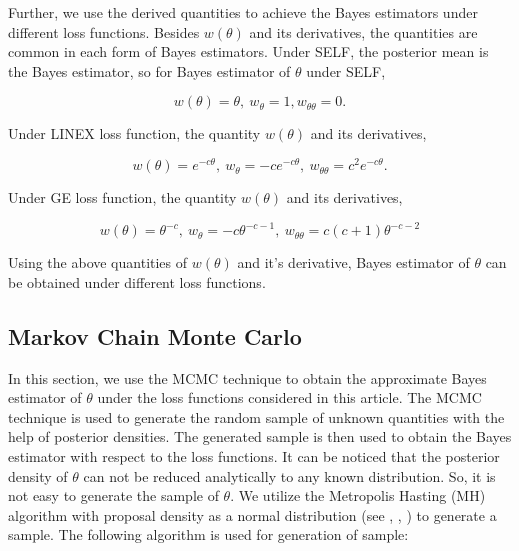 \documentclass[11pt,a4paper]{article}
\numberwithin{equation}{section}
\begin{document}
	Further, we use the derived quantities to achieve the Bayes estimators under different loss functions.  Besides $w(\theta)$ and its derivatives, the quantities are common in each form of Bayes estimators. Under SELF, the posterior mean is the Bayes estimator, so for Bayes estimator of $\theta$ under SELF,

	\begin{equation*}

		w(\theta)=\theta ,~w_{\theta}=1,w_{\theta\theta}=0.

	\end{equation*}

	Under LINEX loss function, the quantity $w(\theta)$ and its derivatives, 

	\begin{equation*}

		w(\theta)=e^{-c\theta},~w_{\theta}=-ce^{-c\theta},~w_{\theta\theta}=c^2e^{-c\theta}.

	\end{equation*}

	Under GE loss function, the quantity $w(\theta)$ and its derivatives, 

	\begin{equation*}

		w(\theta)=\theta^{-c},~w_{\theta}=-c\theta^{-c-1},~w_{\theta\theta}=c(c+1)\theta^{-c-2}

	\end{equation*}

	Using the above quantities of $w(\theta)$ and it's derivative, Bayes estimator of $\theta$ can be obtained under different loss functions. 

	

	\subsection{Markov Chain Monte Carlo}

	In this section, we use the MCMC technique to obtain the approximate Bayes estimator of $\theta$ under the loss functions considered in this article. The MCMC technique is used to generate the random sample of unknown quantities with the help of posterior densities. The generated sample is then used to obtain the Bayes estimator with respect to the loss functions. It can be noticed that the posterior density of $\theta$ can not be reduced analytically to any known distribution. So, it is not easy to generate  the sample of $\theta$. We utilize the Metropolis Hasting (MH) algorithm with proposal density as a normal distribution (see \cite{gelman2013bayesian}, \cite{arshad2022stress}, \cite{azhad2022statistical}) to generate a sample. The following algorithm is used for generation of sample:
\end{document}
